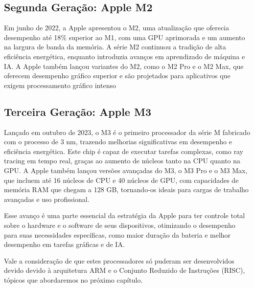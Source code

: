 \documentclass[a4paper,times,12pt]{article}
\begin{document}
\subsection{Segunda Geração: Apple M2}
\hspace{+15pt} 
Em junho de 2022, a Apple apresentou o M2, uma atualização que oferecia desempenho até 18\% superior ao M1, com uma GPU aprimorada e um aumento na largura de banda da memória. A série M2 continuou a tradição de alta eficiência energética, enquanto introduzia avanços em aprendizado de máquina e IA. A Apple também lançou variantes do M2, como o M2 Pro e o M2 Max, que oferecem desempenho gráfico superior e são projetados para aplicativos que exigem processamento gráfico intenso
\subsection{Terceira Geração: Apple M3}
\hspace{+15pt}
Lançado em outubro de 2023, o M3 é o primeiro processador da série M fabricado com o processo de 3 nm, trazendo melhorias significativas em desempenho e eficiência energética. Este chip é capaz de executar tarefas complexas, como ray tracing em tempo real, graças ao aumento de núcleos tanto na CPU quanto na GPU. A Apple também lançou versões avançadas do M3, o M3 Pro e o M3 Max, que incluem até 16 núcleos de CPU e 40 núcleos de GPU, com capacidades de memória RAM que chegam a 128 GB, tornando-os ideais para cargas de trabalho avançadas e uso profissional.

Esse avanço é uma parte essencial da estratégia da Apple para ter controle total sobre o hardware e o software de seus dispositivos, otimizando o desempenho para suas necessidades específicas, como maior duração da bateria e melhor desempenho em tarefas gráficas e de IA. 

Vale a consideração de que estes processadores só puderam ser desenvolvidos devido devido à arquitetura ARM e o Conjunto Reduzido de Instruções (RISC), tópicos que abordaremos no próximo capítulo.
\end{document}
